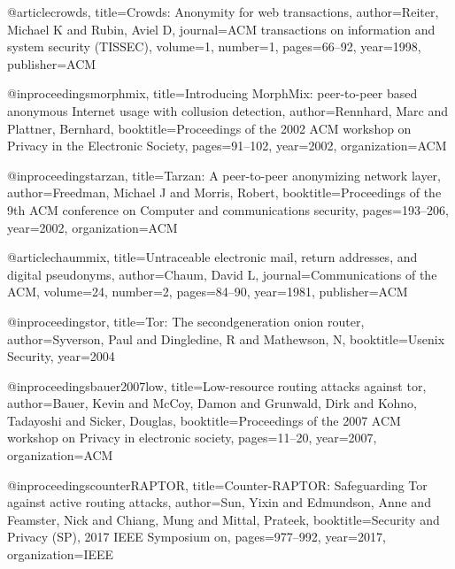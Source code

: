 @article{crowds,
  title={Crowds: Anonymity for web transactions},
  author={Reiter, Michael K and Rubin, Aviel D},
  journal={ACM transactions on information and system security (TISSEC)},
  volume={1},
  number={1},
  pages={66--92},
  year={1998},
  publisher={ACM}
}

@inproceedings{morphmix,
  title={Introducing MorphMix: peer-to-peer based anonymous Internet usage with collusion detection},
  author={Rennhard, Marc and Plattner, Bernhard},
  booktitle={Proceedings of the 2002 ACM workshop on Privacy in the Electronic Society},
  pages={91--102},
  year={2002},
  organization={ACM}
}

@inproceedings{tarzan,
  title={Tarzan: A peer-to-peer anonymizing network layer},
  author={Freedman, Michael J and Morris, Robert},
  booktitle={Proceedings of the 9th ACM conference on Computer and communications security},
  pages={193--206},
  year={2002},
  organization={ACM}
}

@article{chaummix,
  title={Untraceable electronic mail, return addresses, and digital pseudonyms},
  author={Chaum, David L},
  journal={Communications of the ACM},
  volume={24},
  number={2},
  pages={84--90},
  year={1981},
  publisher={ACM}
}

@inproceedings{tor,
  title={Tor: The secondgeneration onion router},
  author={Syverson, Paul and Dingledine, R and Mathewson, N},
  booktitle={Usenix Security},
  year={2004}
}

@inproceedings{bauer2007low,
  title={Low-resource routing attacks against tor},
  author={Bauer, Kevin and McCoy, Damon and Grunwald, Dirk and Kohno, Tadayoshi and Sicker, Douglas},
  booktitle={Proceedings of the 2007 ACM workshop on Privacy in electronic society},
  pages={11--20},
  year={2007},
  organization={ACM}
}

@inproceedings{counterRAPTOR,
  title={Counter-RAPTOR: Safeguarding Tor against active routing attacks},
  author={Sun, Yixin and Edmundson, Anne and Feamster, Nick and Chiang, Mung and Mittal, Prateek},
  booktitle={Security and Privacy (SP), 2017 IEEE Symposium on},
  pages={977--992},
  year={2017},
  organization={IEEE}
}
